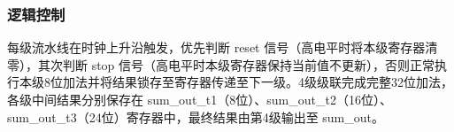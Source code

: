 \subsubsection{逻辑控制}
每级流水线在时钟上升沿触发，优先判断 reset 信号（高电平时将本级寄存器清零），其次判断 stop 信号（高电平时本级寄存器保持当前值不更新），否则正常执行本级8位加法并将结果锁存至寄存器传递至下一级。4级级联完成完整32位加法，各级中间结果分别保存在 sum\_out\_t1（8位）、sum\_out\_t2（16位）、sum\_out\_t3（24位）寄存器中，最终结果由第4级输出至 sum\_out。

